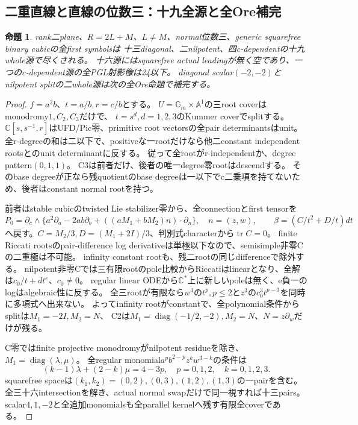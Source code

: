 \documentclass[a4paper,11pt]{ltjsarticle}
\newtheorem{proposition}{命題}[section]
\theoremstyle{definition}
\begin{document}
\subsection{二重直線と直線の位数三：十九全源と全Ore補完}
\begin{proposition}\label{prop:plane-double-line-m3-partial}
rank二plane、$R=2L+M$、$L\ne M$、normal位数三、generic squarefree binary cubicの全first symbolsは
十三diagonal、二nilpotent、四c-dependentの十九whole源で尽くされる。
十六源にはsquarefree actual leadingが無く空であり、一つのc-dependent源の全PGL射影像は24以下。
diagonal scalar$(-2,-2)$とnilpotent splitの二whole源は次の全Ore命題で補完する。
\end{proposition}
\begin{proof}
$f=a^2b$、$t=a/b,r=c/b$とする。
$U=\mathbb G_m\times\mathbb A^1$の三root coverはmonodromy$1,C_2,C_3$だけで、
$t=s^d,d=1,2,3$のKummer coverでsplitする。
$\mathbb C[s,s^{-1},r]$はUFD/Pic零、primitive root vectorsの全pair determinantsはunit。
全r-degreeの和は二以下で、positiveな一rootだけなら他二constant independent rootsとのunit determinantに反する。
従って全rootがr-independentか、degree pattern$(0,1,1)$。
C3は前者だけ、後者の唯一degree零rootはdescendする。
そのbase degreeが正なら残quotientのbase degreeは一以下でc二乗項を持てないため、後者はconstant normal rootを持つ。

前者はstable cubicのtwisted Lie stabilizer零から、全connectionとfirst tensorを
\[
 P_0=\partial_c\wedge\{a^2\partial_a-2ab\partial_b+
             ((aM_1+bM_2)n)\cdot\partial_n\},\quad n=(z,w),
 \qquad\beta=(C/t^2+D/t)dt
\]
へ戻す。$C=M_2/3,D=(M_1+2I)/3$、判別式characterから$\operatorname{tr}C=0$。
finite Riccati rootsのpair-difference log derivativeは単極以下なので、semisimple非零Cの二重極は不可能。
infinity constant rootも、残二rootの同じdifferenceで除外する。
nilpotent非零Cでは三有限rootのpole比較からRiccatiはlinearとなり、全解は$c_0/t+d t^e$、$c_0\ne0$。
regular linear ODEから$\mathbb C^*$上に新しいpoleは無く、e負一のlogはalgebraic性に反する。
全三rootが有限なら$w^3$の$t^p,p\le2$と$z^3$の$c_0^3t^{p-3}$を同時に多項式へ出来ない。
よってinfinity rootがconstantで、全polynomial条件からsplitは$M_1=-2I,M_2=N$、
C2は$M_1=\operatorname{diag}(-1/2,-2),M_2=N$、$N=z\partial_w$だけが残る。

C零ではfinite projective monodromyがnilpotent residueを除き、$M_1=\operatorname{diag}(\lambda,\mu)$。
全regular monomial$a^pb^{2-p}z^kw^{3-k}$の条件は
\[
 (k-1)\lambda+(2-k)\mu=4-3p,\quad p=0,1,2,\quad k=0,1,2,3.
\]
squarefree spaceは$(k_1,k_2)=(0,2),(0,3),(1,2),(1,3)$の一pairを含む。
全三十六intersectionを解き、actual normal swapだけで同一視すれば十三pairs。
scalar$4,1,-2$と全追加monomialsも全parallel kernelへ残す有限全coverである。


\end{proof}
\end{document}
